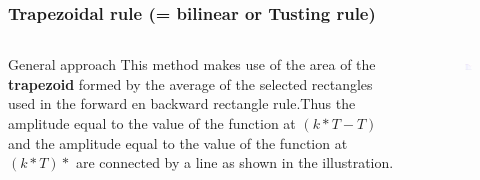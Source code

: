 \begin{frame}
	\frametitle{Trapezoidal rule (= bilinear or Tusting rule)}
	
\begin{columns}
	\begin{column}{0.5\textwidth}
		\begin{block}{General approach}
			This method makes use of the area of the \textbf{trapezoid} formed by the average of the selected rectangles used in the forward en backward rectangle rule.Thus the amplitude equal to the value of the function at $(k*T - T)$ and the amplitude equal to the value of the function at $(k*T)*$ are connected by a line as shown in the illustration.
		\end{block}	
	\end{column}

	\begin{column}{0.5\textwidth}
		\begin{figure}
			\centering
			\includegraphics[width=1\linewidth]{Trapezium}
		\end{figure}
	\end{column}	
	
\end{columns}
\end{frame}

